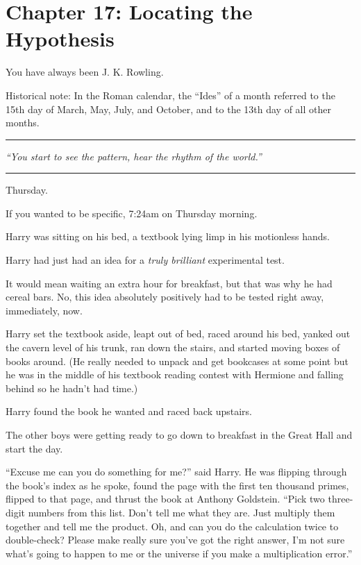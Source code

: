 \chapter{Chapter 17: Locating the Hypothesis}
You have always been J. K. Rowling.

Historical note: In the Roman calendar, the ``Ides'' of a month referred
to the 15th day of March, May, July, and October, and to the 13th day of
all other months.

\begin{center}\rule{3in}{0.4pt}\end{center}

\emph{``You start to see the pattern, hear the rhythm of the world.''}

\begin{center}\rule{3in}{0.4pt}\end{center}

Thursday.

If you wanted to be specific, 7:24am on Thursday morning.

Harry was sitting on his bed, a textbook lying limp in his motionless
hands.

Harry had just had an idea for a \emph{truly brilliant} experimental
test.

It would mean waiting an extra hour for breakfast, but that was why he
had cereal bars. No, this idea absolutely positively had to be tested
right away, immediately, now.

Harry set the textbook aside, leapt out of bed, raced around his bed,
yanked out the cavern level of his trunk, ran down the stairs, and
started moving boxes of books around. (He really needed to unpack and
get bookcases at some point but he was in the middle of his textbook
reading contest with Hermione and falling behind so he hadn't had time.)

Harry found the book he wanted and raced back upstairs.

The other boys were getting ready to go down to breakfast in the Great
Hall and start the day.

``Excuse me can you do something for me?'' said Harry. He was flipping
through the book's index as he spoke, found the page with the first ten
thousand primes, flipped to that page, and thrust the book at Anthony
Goldstein. ``Pick two three-digit numbers from this list. Don't tell me
what they are. Just multiply them together and tell me the product. Oh,
and can you do the calculation twice to double-check? Please make really
sure you've got the right answer, I'm not sure what's going to happen to
me or the universe if you make a multiplication error.''

